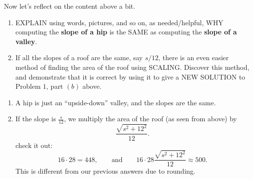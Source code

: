 \documentclass[hints,nooutcomes,noauthor,handout]{ximera}
\begin{document}
\begin{question}
  Now let's reflect on the content above a bit.
  \begin{enumerate}
    \item EXPLAIN using words, pictures, and so on, as needed/helpful,
      WHY computing the \textbf{slope of a hip} is the SAME as computing the
      \textbf{slope of a valley}.
    \item If all the slopes of a roof are the same, say $s/12$, there
      is an even easier method of finding the area of the roof using
      SCALING. Discover this method, and demonstrate that it is
      correct by using it to give a NEW SOLUTION to Problem $1$, part
      $(b)$ above.
  \end{enumerate}
  \begin{freeResponse}
    \begin{enumerate}
  \item A hip is just an ``upside-down'' valley, and the slopes are
    the same.
  \item If the slope is $\frac{s}{12}$, we multiply the area of the
    roof (as seen from above) by
    \[
    \frac{\sqrt{s^2+12^2}}{12}.
    \]
    check it out:
    \[
    16\cdot 28 = 448,\qquad\text{and}\qquad  16\cdot 28 \frac{\sqrt{s^2+12^2}}{12} \approx 500.
    \]
    This is different from our previous answers due to rounding.
    \end{enumerate}
  \end{freeResponse}
\end{question}
\end{document}

